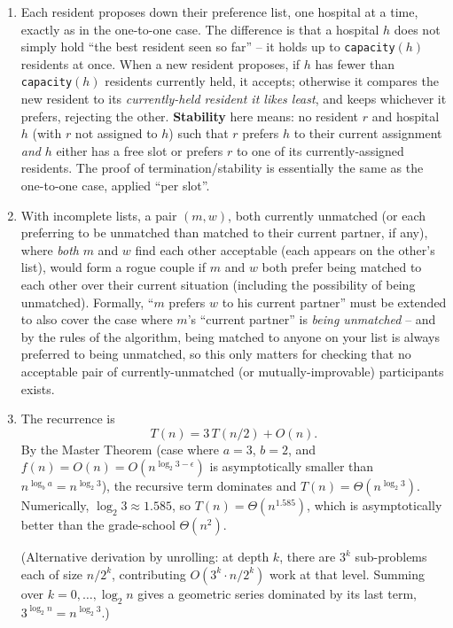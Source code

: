 \documentclass[11pt]{article}
\begin{document}
\begin{enumerate}[label=\textbf{A\arabic*.}, leftmargin=2.2em]
\item Each resident proposes down their preference list, one hospital at a time, exactly
as in the one-to-one case. The difference is that a hospital $h$ does not simply hold
``the best resident seen so far'' -- it holds up to \texttt{capacity}$(h)$ residents at
once. When a new resident proposes, if $h$ has fewer than \texttt{capacity}$(h)$ residents
currently held, it accepts; otherwise it compares the new resident to its
\emph{currently-held resident it likes least}, and keeps whichever it prefers, rejecting
the other. \textbf{Stability} here means: no resident $r$ and hospital $h$ (with $r$ not
assigned to $h$) such that $r$ prefers $h$ to their current assignment \emph{and} $h$
either has a free slot or prefers $r$ to one of its currently-assigned residents. The
proof of termination/stability is essentially the same as the one-to-one case, applied
``per slot''.

\item With incomplete lists, a pair $(m,w)$, both currently unmatched (or each preferring
to be unmatched than matched to their current partner, if any), where \emph{both} $m$ and
$w$ find each other acceptable (each appears on the other's list), would form a rogue
couple if $m$ and $w$ both prefer being matched to each other over their current
situation (including the possibility of being unmatched). Formally, ``$m$ prefers $w$ to
his current partner'' must be extended to also cover the case where $m$'s ``current
partner'' is \emph{being unmatched} -- and by the rules of the algorithm, being matched to
anyone on your list is always preferred to being unmatched, so this only matters for
checking that no acceptable pair of currently-unmatched (or mutually-improvable)
participants exists.

\item The recurrence is
\[
  T(n) = 3\,T(n/2) + O(n).
\]
By the Master Theorem (case where $a=3$, $b=2$, and $f(n)=O(n)=O(n^{\log_2 3 - \epsilon})$
is asymptotically smaller than $n^{\log_b a} = n^{\log_2 3}$), the recursive term
dominates and $T(n) = \Theta(n^{\log_2 3})$. Numerically, $\log_2 3 \approx 1.585$, so
$T(n) = \Theta(n^{1.585})$, which is asymptotically better than the grade-school
$\Theta(n^2)$.

(Alternative derivation by unrolling: at depth $k$, there are $3^k$ sub-problems each of
size $n/2^k$, contributing $O(3^k \cdot n/2^k)$ work at that level. Summing over
$k=0,\ldots,\log_2 n$ gives a geometric series dominated by its last term,
$3^{\log_2 n} = n^{\log_2 3}$.)


\end{enumerate}
\end{document}
